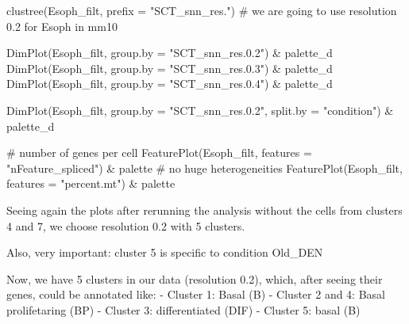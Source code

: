 \documentclass[
  letterpaper,
  DIV=11,
  numbers=noendperiod]{scrreprt}
\newenvironment{Shaded}{\begin{snugshade}}{\end{snugshade}}
\newcommand{\AttributeTok}[1]{\textcolor[rgb]{0.40,0.45,0.13}{#1}}
\newcommand{\CommentTok}[1]{\textcolor[rgb]{0.37,0.37,0.37}{#1}}
\newcommand{\FunctionTok}[1]{\textcolor[rgb]{0.28,0.35,0.67}{#1}}
\newcommand{\NormalTok}[1]{\textcolor[rgb]{0.00,0.23,0.31}{#1}}
\newcommand{\SpecialCharTok}[1]{\textcolor[rgb]{0.37,0.37,0.37}{#1}}
\newcommand{\StringTok}[1]{\textcolor[rgb]{0.13,0.47,0.30}{#1}}
\begin{document}
\begin{Shaded}
\begin{Highlighting}[]
\FunctionTok{clustree}\NormalTok{(Esoph\_filt, }\AttributeTok{prefix =} \StringTok{"SCT\_snn\_res."}\NormalTok{) }\CommentTok{\# we are going to use resolution 0.2 for Esoph in mm10}
\end{Highlighting}
\end{Shaded}

\begin{Shaded}
\begin{Highlighting}[]
\FunctionTok{DimPlot}\NormalTok{(Esoph\_filt, }\AttributeTok{group.by =} \StringTok{"SCT\_snn\_res.0.2"}\NormalTok{) }\SpecialCharTok{\&}\NormalTok{ palette\_d}
\FunctionTok{DimPlot}\NormalTok{(Esoph\_filt, }\AttributeTok{group.by =} \StringTok{"SCT\_snn\_res.0.3"}\NormalTok{) }\SpecialCharTok{\&}\NormalTok{ palette\_d}
\FunctionTok{DimPlot}\NormalTok{(Esoph\_filt, }\AttributeTok{group.by =} \StringTok{"SCT\_snn\_res.0.4"}\NormalTok{) }\SpecialCharTok{\&}\NormalTok{ palette\_d}

\FunctionTok{DimPlot}\NormalTok{(Esoph\_filt, }\AttributeTok{group.by =} \StringTok{"SCT\_snn\_res.0.2"}\NormalTok{, }\AttributeTok{split.by =} \StringTok{"condition"}\NormalTok{) }\SpecialCharTok{\&}\NormalTok{ palette\_d}
\end{Highlighting}
\end{Shaded}

\begin{Shaded}
\begin{Highlighting}[]
\CommentTok{\# number of genes per cell}
\FunctionTok{FeaturePlot}\NormalTok{(Esoph\_filt, }\AttributeTok{features =} \StringTok{"nFeature\_spliced"}\NormalTok{) }\SpecialCharTok{\&}\NormalTok{ palette }\CommentTok{\# no huge heterogeneities}
\FunctionTok{FeaturePlot}\NormalTok{(Esoph\_filt, }\AttributeTok{features =} \StringTok{"percent.mt"}\NormalTok{) }\SpecialCharTok{\&}\NormalTok{ palette }
\end{Highlighting}
\end{Shaded}

Seeing again the plots after rerunning the analysis without the cells
from clusters 4 and 7, we choose resolution 0.2 with 5 clusters.

Also, very important: cluster 5 is specific to condition Old\_DEN

Now, we have 5 clusters in our data (resolution 0.2), which, after
seeing their genes, could be annotated like: - Cluster 1: Basal (B) -
Cluster 2 and 4: Basal prolifetaring (BP) - Cluster 3: differentiated
(DIF) - Cluster 5: basal (B)
\end{document}
